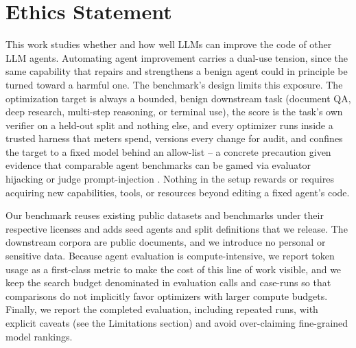 \section*{Ethics Statement}

This work studies whether and how well LLMs can improve the code of other LLM
agents. Automating agent improvement carries a dual-use tension, since the same
capability that repairs and strengthens a benign agent could in principle be
turned toward a harmful one. The benchmark's design limits this exposure. The
optimization target is always a bounded, benign downstream task (document QA,
deep research, multi-step reasoning, or terminal use), the score is the task's
own verifier on a held-out split and nothing else, and every optimizer runs inside
a trusted harness that meters spend, versions every change for audit, and
confines the target to a fixed model behind an allow-list -- a concrete
precaution given evidence that comparable agent benchmarks can be gamed via
evaluator hijacking or judge prompt-injection \citep{benchjack2026}. Nothing in
the setup rewards or requires acquiring new capabilities, tools, or resources
beyond editing a fixed agent's code.

Our benchmark reuses existing public datasets and benchmarks under their
respective licenses and adds seed agents and split definitions that we release.
The downstream corpora are public documents, and we introduce no personal or
sensitive data. Because agent evaluation is compute-intensive, we report token
usage as a first-class metric to make the cost of this line of work visible, and
we keep the search budget denominated in evaluation calls and case-runs so that comparisons do not
implicitly favor optimizers with larger compute budgets. Finally, we report
the completed evaluation, including repeated runs, with explicit caveats (see
the Limitations section) and avoid over-claiming fine-grained model rankings.
